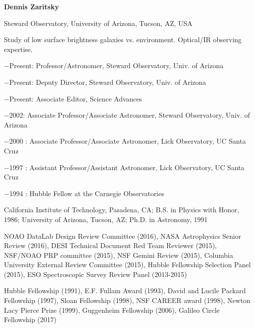 

\pagestyle{empty}


\noindent
\hskip -0.8cm {\bf Dennis Zaritsky}

\vskip -8pt
\noindent
Steward Observatory, University of Arizona, Tucson, AZ, USA

\smallskip
\noindent
{}
Study of low surface brightness galaxies vs. environment. Optical/IR observing expertise.

\smallskip
\noindent
{}



\vskip -5pt
$-$Present: Professor/Astronomer, Steward Observatory, Univ. of Arizona

\vskip -8pt
$-$Present: Deputy Director, Steward Observatory, Univ. of Arizona


\vskip -8pt
$-$Present: Associate Editor, Science Advances


\smallskip
\noindent
{}

\vskip -5pt
$-$2002: Associate Professor/Associate Astronomer, Steward Observatory, Univ. of Arizona

\vskip -8pt
$-$2000 : Associate Professor/Associate Astronomer, Lick Observatory, 
UC Santa Cruz

\vskip -8pt
$-$1997 : Assistant Professor/Assistant Astronomer, Lick Observatory, 
UC Santa Cruz

\vskip -8pt
$-$1994 : Hubble Fellow at the Carnegie Observatories



\smallskip
\noindent
{}
California Institute of Technology, Pasadena, CA; B.S. in Physics  with Honor, 1986;
University of Arizona, Tucson, AZ; Ph.D. in Astronomy, 1991



\smallskips
\noindent
{}
NOAO DataLab Design Review Committee (2016), NASA Astrophysics Senior Review (2016), DESI Technical Document Red Team Reviewer (2015), NSF/NOAO PRP committee (2015), NSF Gemini Review (2015), Columbia University External Review Committee (2015), Hubble Fellowship Selection Panel (2015), ESO Spectroscopic Survey Review Panel (2013-2015)

\smallskip
\noindent
{}
Hubble Fellowship (1991), E.F. Fullam Award (1993), David and Lucile Packard Fellowship (1997), Sloan Fellowship (1998), NSF CAREER award (1998), Newton Lacy Pierce Prize (1999), Guggenheim Fellowship (2006), Galileo Circle Fellowship (2017)

